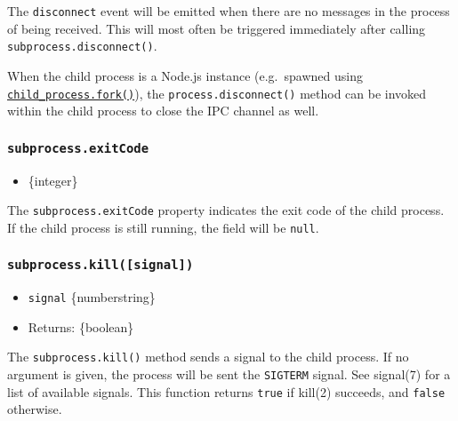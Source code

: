 The \texttt{\textquotesingle{}disconnect\textquotesingle{}} event will
be emitted when there are no messages in the process of being received.
This will most often be triggered immediately after calling
\texttt{subprocess.disconnect()}.

When the child process is a Node.js instance (e.g.~spawned using
\hyperref[child_processforkmodulepath-args-options]{\texttt{child\_process.fork()}}),
the \texttt{process.disconnect()} method can be invoked within the child
process to close the IPC channel as well.

\subsubsection{\texorpdfstring{\texttt{subprocess.exitCode}}{subprocess.exitCode}}\label{subprocess.exitcode}

\begin{itemize}
\tightlist
\item
  \{integer\}
\end{itemize}

The \texttt{subprocess.exitCode} property indicates the exit code of the
child process. If the child process is still running, the field will be
\texttt{null}.

\subsubsection{\texorpdfstring{\texttt{subprocess.kill({[}signal{]})}}{subprocess.kill({[}signal{]})}}\label{subprocess.killsignal}

\begin{itemize}
\tightlist
\item
  \texttt{signal} \{number\textbar string\}
\item
  Returns: \{boolean\}
\end{itemize}

The \texttt{subprocess.kill()} method sends a signal to the child
process. If no argument is given, the process will be sent the
\texttt{\textquotesingle{}SIGTERM\textquotesingle{}} signal. See
signal(7) for a list of available signals. This function returns
\texttt{true} if kill(2) succeeds, and \texttt{false} otherwise.

